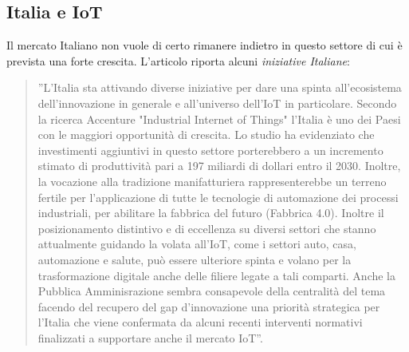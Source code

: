 \documentclass[a4paper]{report} %
\begin{document}
\subsection{Italia e IoT} 
Il mercato Italiano non vuole di certo rimanere indietro in questo settore di cui è prevista una forte crescita. L'articolo \cite{art:rif.22} riporta alcuni \textit{iniziative Italiane}:
\begin{quote}
	''L'Italia sta attivando diverse iniziative per dare una spinta all’ecosistema dell’innovazione in generale e all’universo dell’IoT in particolare. Secondo la ricerca Accenture "Industrial Internet of Things" l’Italia è uno dei Paesi con le maggiori opportunità di crescita. Lo studio ha evidenziato che investimenti aggiuntivi in questo settore porterebbero a un incremento stimato di produttività  pari a 197 miliardi di dollari entro il 2030.
	Inoltre, la vocazione alla tradizione manifatturiera rappresenterebbe un terreno fertile per l’applicazione di tutte le tecnologie di automazione dei processi industriali, per abilitare la fabbrica del futuro (Fabbrica 4.0). Inoltre il posizionamento distintivo e di eccellenza su diversi settori che stanno attualmente guidando la volata all’IoT, come i settori auto, casa, automazione e salute, può essere ulteriore spinta e volano per la trasformazione digitale anche delle filiere legate a tali comparti.
	Anche la Pubblica Amminisrazione sembra consapevole della centralità del tema facendo del recupero del gap d’innovazione una priorità strategica per l’Italia che viene confermata da alcuni recenti interventi normativi finalizzati a supportare anche il mercato IoT''.
\end{quote}
\end{document}
